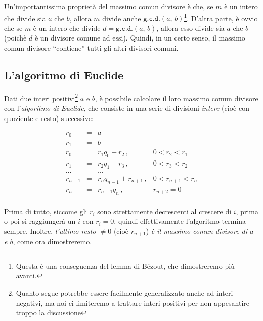 \documentclass[pdflatex,11pt,a4paper,oneside]{article}
\newcommand{\gcdop}[0]{\ensuremath{\mathtt{g.c.d.}}}
\newcommand{\xgcd}[1]{\ensuremath{\gcdop\left({#1}\right)}}
\renewcommand{\gcd}[2]{\xgcd{{#1},\,{#2}}}
\begin{document}
Un'importantissima propriet\`a del massimo comun divisore \`e che, se
$m$ \`e un intero che divide sia $a$ che $b$, allora $m$ divide anche
$\gcd{a}{b}$\footnote{Questa \`e una conseguenza del lemma di B\'ezout,
che dimostreremo pi\`u avanti.}. D'altra parte, \`e ovvio che se $m$ \`e 
un intero che divide $d = \gcd{a}{b}$, allora esso divide sia $a$ che $b$
(poich\`e $d$ \`e un divisore comune ad essi).  Quindi, in un certo senso,
il massimo comun divisore ``contiene'' tutti gli altri divisori comuni.


\subsection{L'algoritmo di Euclide}

Dati due interi positivi\footnote{Quanto segue potrebbe essere facilmente
generalizzato anche ad interi negativi, ma noi ci limiteremo a trattare
interi positivi per non appesantire troppo la discussione} $a$ e $b$,
\`e possibile calcolare il loro massimo comun divisore con
l'\emph{algoritmo di Euclide}, che consiste in una serie di divisioni
\emph{intere} (cio\`e con quoziente e resto) successive:

\begin{displaymath}
  \begin{array}{rcll}
      r_0  & \!=\! & a \\
      r_1  & \!=\! & b \\
      r_0  & \!=\! & r_1 q_0 + r_2\,, & 0 < r_2 < r_1 \\
      r_1  & \!=\! & r_2 q_1 + r_3\,, & 0 < r_3 < r_2 \\
    \ldots &       & \ldots \\
   r_{n-1} & \!=\! & r_{n} q_{n-1} + r_{n+1}\,, & 0 < r_{n+1} < r_{n} \\
     r_{n} & \!=\! & r_{n+1} q_{n}\,, & r_{n+2} = 0 \\
  \end{array}
\end{displaymath}

Prima di tutto, siccome gli $r_i$ sono strettamente decrescenti al
crescere di $i$, prima o poi si raggiunger\`a un $i$ con $r_i = 0$,
quindi effettivamente l'algoritmo termina sempre.  Inoltre, \emph{l'ultimo
resto $\neq 0$} (cio\`e $r_{n+1}$) \emph{\`e il massimo comun divisore di
$a$ e $b$}, come ora dimostreremo.
\end{document}
